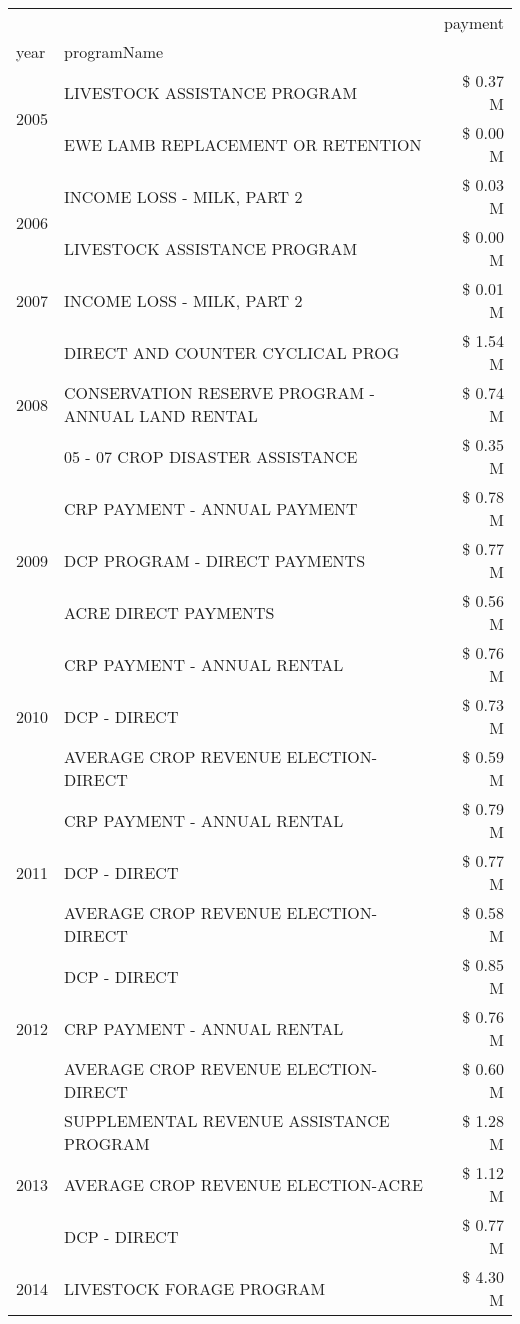 \begin{tabular}{llr}
\toprule
 &  & payment \\
year & programName &  \\
\midrule
\multirow[t]{2}{*}{2005} & LIVESTOCK ASSISTANCE PROGRAM & \$ 0.37 M \\
 & EWE LAMB REPLACEMENT OR RETENTION & \$ 0.00 M \\
\cline{1-3}
\multirow[t]{2}{*}{2006} & INCOME LOSS - MILK, PART 2 & \$ 0.03 M \\
 & LIVESTOCK ASSISTANCE PROGRAM & \$ 0.00 M \\
\cline{1-3}
2007 & INCOME LOSS - MILK, PART 2 & \$ 0.01 M \\
\cline{1-3}
\multirow[t]{3}{*}{2008} & DIRECT AND COUNTER CYCLICAL PROG & \$ 1.54 M \\
 & CONSERVATION RESERVE PROGRAM - ANNUAL LAND RENTAL & \$ 0.74 M \\
 & 05 - 07 CROP DISASTER ASSISTANCE & \$ 0.35 M \\
\cline{1-3}
\multirow[t]{3}{*}{2009} & CRP PAYMENT - ANNUAL PAYMENT & \$ 0.78 M \\
 & DCP PROGRAM - DIRECT PAYMENTS & \$ 0.77 M \\
 & ACRE DIRECT PAYMENTS & \$ 0.56 M \\
\cline{1-3}
\multirow[t]{3}{*}{2010} & CRP PAYMENT - ANNUAL RENTAL & \$ 0.76 M \\
 & DCP - DIRECT & \$ 0.73 M \\
 & AVERAGE CROP REVENUE ELECTION-DIRECT & \$ 0.59 M \\
\cline{1-3}
\multirow[t]{3}{*}{2011} & CRP PAYMENT - ANNUAL RENTAL & \$ 0.79 M \\
 & DCP - DIRECT & \$ 0.77 M \\
 & AVERAGE CROP REVENUE ELECTION-DIRECT & \$ 0.58 M \\
\cline{1-3}
\multirow[t]{3}{*}{2012} & DCP - DIRECT & \$ 0.85 M \\
 & CRP PAYMENT - ANNUAL RENTAL & \$ 0.76 M \\
 & AVERAGE CROP REVENUE ELECTION-DIRECT & \$ 0.60 M \\
\cline{1-3}
\multirow[t]{3}{*}{2013} & SUPPLEMENTAL REVENUE ASSISTANCE PROGRAM & \$ 1.28 M \\
 & AVERAGE CROP REVENUE ELECTION-ACRE & \$ 1.12 M \\
 & DCP - DIRECT & \$ 0.77 M \\
\cline{1-3}
\multirow[t]{3}{*}{2014} & LIVESTOCK FORAGE PROGRAM & \$ 4.30 M \\

\end{tabular}
